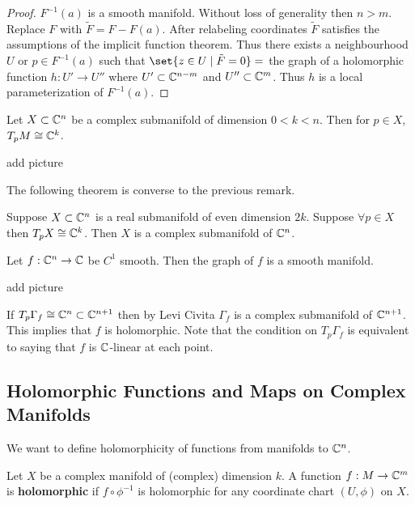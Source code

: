 \begin{proof}
    $F^{-1}(a)$ is a smooth manifold. Without loss of generality then $n> m$. Replace $F$ with $\tilde{F} = F - F(a)$. After relabeling coordinates $\tilde{F}$ satisfies the assumptions of the implicit function theorem. Thus there exists a neighbourhood $U$ or $p \in F^{-1}(a)$ such that $\set{z \in U \mid \tilde{F} = 0} = $ the graph of a holomorphic function $h : U' \to U''$ where $U' \subset \mathbb{C}^{n-m}$ and $U'' \subset \mathbb{C}^m$. Thus $h$ is a local parameterization of $F^{-1}(a)$.
\end{proof}

\begin{remark}
    Let $X \subset \mathbb{C}^n$ be a complex submanifold of dimension $0 < k < n$. Then for $p \in X$, $T_pM \cong \mathbb{C}^k$.

    add picture
\end{remark}

The following theorem is converse to the previous remark.

\begin{theorem}
    Suppose $X \subset \mathbb{C}^n$ is a real submanifold of even dimension $2k$. Suppose $\forall p \in X$ then $T_pX \cong \mathbb{C}^k$. Then $X$ is a complex submanifold of $\mathbb{C}^n$.
\end{theorem}

\begin{example}
    Let $f : \mathbb{C}^n \to \mathbb{C}$ be $C^1$ smooth. Then the graph of $f$ is a smooth manifold.

    add picture

    If $T_p \Gamma_f \cong \mathbb{C}^n \subset \mathbb{C}^{n+1}$ then by Levi Civita $\Gamma_f$ is a complex submanifold of $\mathbb{C}^{n+1}$. This implies that $f$ is holomorphic. Note that the condition on $T_p \Gamma_f$ is equivalent to saying that $f$ is $\mathbb{C}$-linear at each point.
\end{example}

\subsection{Holomorphic Functions and Maps on Complex Manifolds}

We want to define holomorphicity of functions from manifolds to $\mathbb{C}^n$.

\begin{definition}
    Let $X$ be a complex manifold of (complex) dimension $k$. A function $f : M \to \mathbb{C}^m$ is \textbf{holomorphic} if $f \circ \phi^{-1}$ is holomorphic for any coordinate chart $(U,\phi)$ on $X$.
\end{definition}


